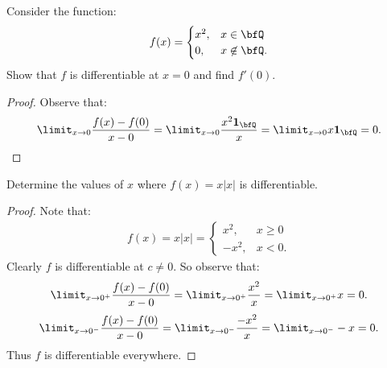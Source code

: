 \documentclass[11pt,twoside,openany]{memoir}
\begin{document}
    \begin{exercise}
        Consider the function:
            \begin{equation*}
            \begin{split}
                f(x) =
                    \begin{cases}
                        x^2, & x \in \bfQ \\
                        0, & x \not\in \bfQ .
                    \end{cases}
            \end{split}
            \end{equation*}
        Show that $f$ is differentiable at $x = 0$ and find $f'(0)$.
    \end{exercise}
        \begin{proof}
            Observe that:
                \begin{equation*}
                \begin{split}
                    \limit_{x \rightarrow 0 }\frac{f(x) - f(0)}{x- 0} = \limit_{x \rightarrow 0}\frac{ x^2 \mathbf{1}_\bfQ}{x} = \limit_{x \rightarrow 0}x \mathbf{1}_\bfQ = 0.
                \end{split}
                \end{equation*}
        \end{proof}
    \begin{exercise}
        Determine the values of $x$ where $f(x) = x|x|$ is differentiable.
    \end{exercise}
        \begin{proof}
            Note that:
                \begin{equation*}
                \begin{split}
                    f(x) = x|x| = \begin{cases} x^2, & x \geq 0 \\ -x^2, & x < 0.\end{cases}
                \end{split}
                \end{equation*}
            Clearly $f$ is differentiable at $c \neq 0$. So observe that:
                \begin{equation*}
                \begin{split}
                    \limit_{x \rightarrow 0^+} \frac{f(x) - f(0)}{x- 0} = \limit_{x \rightarrow 0^+}\frac{x^2}{x} = \limit_{x \rightarrow 0^+}x = 0.
                \end{split}
                \end{equation*}
                \begin{equation*}
                \begin{split}
                    \limit_{x \rightarrow 0^-} \frac{f(x) - f(0)}{x- 0} = \limit_{x \rightarrow 0^-}\frac{-x^2}{x} = \limit_{x \rightarrow 0^-}-x = 0.
                \end{split}
                \end{equation*}
            Thus $f$ is differentiable everywhere.
        \end{proof}
\end{document}
